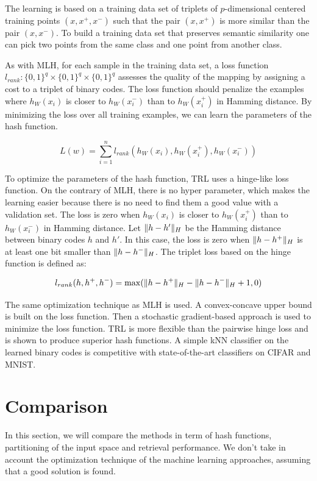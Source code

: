 The learning is based on a training data set of triplets of $p$-dimensional centered training points $(x, x^{+}, x^{-})$ such that the pair $(x, x^{+})$ is more similar than the pair $(x, x^{-})$. To build a training data set that preserves semantic similarity one can pick two points from the same class and one point from another class.

As with MLH, for each sample in the training data set, a loss function $l_{rank}: \{0, 1\}^{q}\times\{0, 1\}^{q}\times\{0, 1\}^{q}$ assesses the quality of the mapping by assigning a cost to a triplet of binary codes. The loss function should penalize the examples where $h_W(x_i)$ is closer to $h_W(x^{-}_i)$ than to $h_W(x^{+}_i)$ in Hamming distance. By minimizing the loss over all training examples, we can learn the parameters of the hash function.

\[L(w)=\sum\limits_{i=1}^n l_{rank}(h_W(x_i), h_W(x^{+}_i), h_W(x^{-}_i))\]

To optimize the parameters of the hash function, TRL uses a hinge-like loss function. On the contrary of MLH, there is no hyper parameter, which makes the learning easier because there is no need to find them a good value with a validation set. The loss is zero when $h_W(x_i)$ is closer to $h_W(x^{+}_i)$ than to $h_W(x^{-}_i)$ in Hamming distance. Let $\lVert h - h'\rVert_{H}$ be the Hamming distance between binary codes $h$ and $h'$. In this case, the loss is zero when $\lVert h - h^{+}\rVert_{H}$ is at least one bit smaller than $\lVert h - h^{-}\rVert_{H}$. The triplet loss based on the hinge function is defined as:

\[
	l_{rank}(h, h^{+}, h^{-})=\max(\lVert h - h^{+}\rVert_{H} - \lVert h - h^{-}\rVert_{H} + 1, 0)
\]

The same optimization technique as MLH is used. A convex-concave upper bound is built on the loss function. Then a stochastic gradient-based approach is used to minimize the loss function. TRL is more flexible than the pairwise hinge loss and is shown to produce superior hash functions. A simple kNN classifier on the learned binary codes is competitive with state-of-the-art classifiers on CIFAR and MNIST.

\section{Comparison}
In this section, we will compare the methods in term of hash functions, partitioning of the input space and retrieval performance. We don't take in account the optimization technique of the machine learning approaches, assuming that a good solution is found. 

